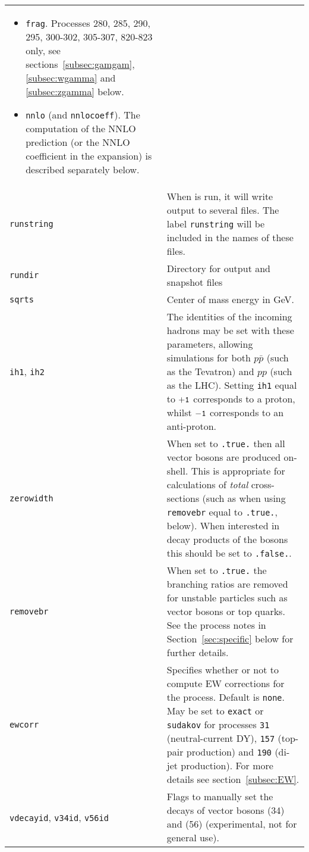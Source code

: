 \begin{longtable}{p{1.5cm}p{12cm}}
\begin{itemize}
			sections~\ref{subsec:stop} and
			\ref{subsec:wt} below.
			\item {\tt frag}.
			Processes 280, 285, 290, 295, 300-302, 305-307,  820-823 only, see sections~\ref{subsec:gamgam}, 
			\ref{subsec:wgamma} and
			\ref{subsec:zgamma} below.
			\item {\tt nnlo} (and {\tt nnlocoeff}).
			The computation of the NNLO prediction (or the NNLO coefficient in the
			expansion) is described separately below.
		\end{itemize} \\
		\texttt{runstring} &
		When \MCFM{} is run, it will write output to several files. The
		label {\tt runstring} will be included in the names of these files.
		\\
		\texttt{rundir} &
		Directory for output and snapshot files
		\\
		\texttt{sqrts} & Center of mass energy in GeV. \\
		\texttt{ih1}, \texttt{ih2} &
		The identities of the incoming hadrons
		may be set with these parameters, allowing simulations for both
		$p{\bar p}$ (such as the Tevatron) and $pp$ (such as the LHC). 
		Setting {\tt ih1} equal to ${\tt +1}$ corresponds to
		a proton, whilst ${\tt -1}$ corresponds to an anti-proton. \\
		\texttt{zerowidth} &
		When set to {\tt .true.} then all vector
		bosons are produced on-shell. This is appropriate for calculations
		of {\it total} cross-sections (such as when using {\tt removebr} equal
		to {\tt .true.}, below). When interested in decay products of the
		bosons this should be set to {\tt .false.}. \\
		\texttt{removebr} &
		When set to {\tt .true.} the branching ratios are 
		removed for unstable particles such as vector bosons or top quarks. See the
		process notes in Section~\ref{sec:specific} below for further details. \\
		\texttt{ewcorr} & 
		Specifies whether or not to compute EW corrections
		for the process.  Default is {\tt none}.  May be set to {\tt exact}
		or {\tt sudakov} for processes {\tt 31} (neutral-current DY),
		{\tt 157} (top-pair production) and {\tt 190} (di-jet production).
		For more details see section~\ref{subsec:EW}.		\\
                {\texttt{vdecayid}}, {\texttt{v34id}}, {\texttt{v56id}} &
		Flags to manually set the decays of vector bosons (34) and
		(56) (experimental, not for general use). \\
		\bottomrule
	\end{longtable}
